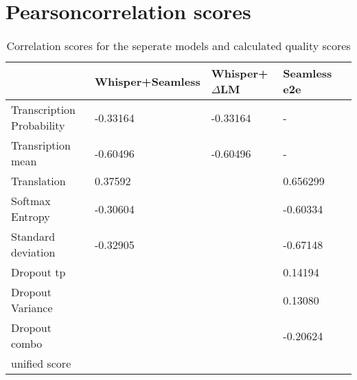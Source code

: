 \section{Pearsoncorrelation scores}
\begin{table}[h]
\begin{tabular}{l|llll}
 &  Whisper+Seamless & Whisper+$\Delta$LM&  Seamless e2e\\ \hline
 Transcription Probability& -0.33164 & -0.33164&  -  \\
 Transription mean & -0.60496 & -0.60496  &   - \\ \hline
Translation& 0.37592 &    & 0.656299\\ 
Softmax Entropy& -0.30604   &  & -0.60334 \\
Standard deviation & -0.32905  &  & -0.67148 \\ \hline
Dropout tp & & & 0.14194\\
Dropout Variance & & & 0.13080\\
Dropout combo & & & -0.20624\\
unified score   &  &  &  %



\end{tabular}
\label{results}
\caption{Correlation scores for the seperate models and calculated quality scores}
\end{table}
